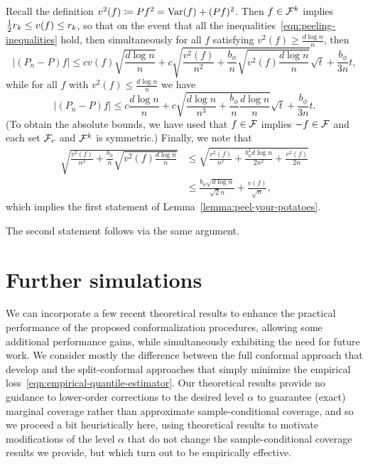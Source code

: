 \documentclass{article}
\newcommand{\radphi}{b_{\phi}}
\begin{document}
Recall the definition $v^2(f) \coloneqq Pf^2 = {\rm Var}(f) + (Pf)^2$. Then
$f \in \mathcal{F}^k$ implies $\frac{1}{2} r_k \le v(f) \le r_k$, so that
on the event that all the inequalities~\eqref{eqn:peeling-inequalities}
hold, then simultaneously for all $f$ satisfying
$v^2(f) \ge \frac{d \log n}{n}$, then
\begin{equation*}
  \left|(P_n - P) f\right|
  \le c v(f) \sqrt{\frac{d \log n}{n}}
  + c \sqrt{\frac{v^2(f)}{n^2}
    + \frac{\radphi}{n} \sqrt{v^2(f) \frac{d \log n}{n}}}
  \sqrt{t} + \frac{\radphi}{3n} t,
\end{equation*}
while for all $f$ with $v^2(f) \le \frac{d \log n}{n}$ we have
\begin{equation*}
  |(P_n - P) f|
  \le c \frac{d \log n}{n}
  + c \sqrt{\frac{d \log n}{n^3}
    + \frac{\radphi}{n} \frac{d \log n}{n}} \sqrt{t} + \frac{\radphi}{3n} t.
\end{equation*}
(To obtain the absolute bounds, we have used that $f \in \mathcal{F}$ implies
$-f \in \mathcal{F}$ and each set $\mathcal{F}_r$ and $\mathcal{F}^k$ is symmetric.)
Finally, we note that
\begin{align*}
  \sqrt{\frac{v^2(f)}{n^2}
    + \frac{\radphi}{n}
    \sqrt{v^2(f) \frac{d \log n}{n}}}
  & \le \sqrt{\frac{v^2(f)}{n^2}
    + \frac{\radphi^2 d \log n}{2 n^2}
    + \frac{v^2(f)}{2 n}} \\
  & \le \frac{\radphi \sqrt{d \log n}}{\sqrt{2} n}
  + \frac{v(f)}{\sqrt{n}},
\end{align*}
which implies the first statement of Lemma~\ref{lemma:peel-your-potatoes}.

The second statement follows via the same argument.

\section{Further simulations}
\label{sec:further-simulations}

We can incorporate a few recent theoretical results to enhance
the practical performance of the proposed conformalization procedures,
allowing some additional performance gains, while simultaneously
exhibiting the need for future work.
%
We consider mostly the difference between the full conformal approach that
\citet{GibbsChCa23} develop and the split-conformal approaches
that simply minimize the empirical
loss~\eqref{eqn:empirical-quantile-estimator}.
%
Our theoretical results provide no guidance to lower-order corrections
to the desired level $\alpha$ to guarantee (exact) marginal coverage
rather than approximate sample-conditional coverage, and
so we proceed a bit heuristically here, using theoretical
results to motivate modifications of the level $\alpha$ that
do not change the sample-conditional coverage results we provide, but
which turn out to be empirically effective.
\end{document}
